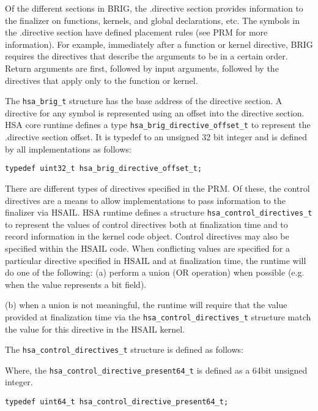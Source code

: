 

Of the different sections in BRIG, the .directive section provides
information to the finalizer on functions, kernels, and global
declarations, etc. The symbols in the .directive section have defined
placement rules (see PRM for more information). For example,
immediately after a function or kernel directive, BRIG requires the
directives that describe the arguments to be in a certain order.
Return arguments are first, followed by input arguments, followed by
the directives that apply only to the function or kernel.

The \texttt{hsa\_brig\_t} structure has the base address of the
directive section. A directive for any symbol is represented using
an offset into the directive section. HSA core runtime defines a
type \texttt{hsa\_brig\_directive\_offset\_t} to represent the
.directive section offset. It is typedef to an unsigned 32 bit
integer and is defined by all implementations as follows:

\begin{lstlisting}
typedef uint32_t hsa_brig_directive_offset_t;
\end{lstlisting}

There are different types of directives specified in the PRM. Of
these, the control directives are a means to allow implementations
to pass information to the finalizer via HSAIL. HSA runtime
defines a structure \texttt{hsa\_control\_directives\_t} to
represent the values of control directives both at finalization
time and to record information in the kernel code object. Control
directives may also be specified within the HSAIL code. When
conflicting values are specified for a particular directive
specified in HSAIL and at finalization time, the runtime will do one
of the following: (a) perform a union (OR operation) when possible
(e.g. when the value represents a bit field).

(b) when a union is not meaningful, the runtime will require that the value provided at
finalization time via the \texttt{hsa\_control\_directives\_t}
structure match the value for this directive in the HSAIL kernel. 

The \texttt{hsa\_control\_directives\_t} structure is defined as
follows:



Where, the \texttt{hsa\_control\_directive\_present64\_t} is defined
as a 64bit unsigned integer.

\begin{lstlisting}
typedef uint64_t hsa_control_directive_present64_t;
\end{lstlisting}

